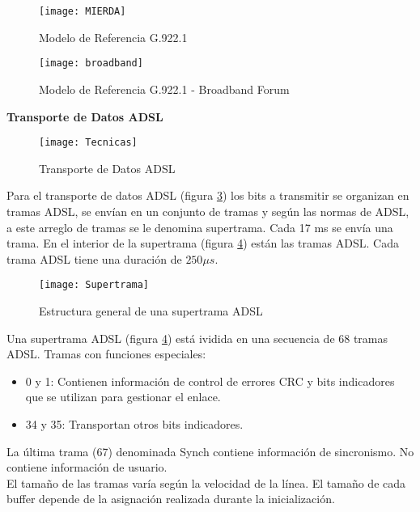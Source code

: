 \documentclass[10pt,portrait, twocolumn]{article}
\begin{document}
\begin{figure}[h]
	\centering
    	\texttt{[image: MIERDA]}
	\caption{Modelo de Referencia G.922.1}
	\label{fig:trADSL}
  \end{figure}	
	
\begin{figure}[h]
	\centering
    	\texttt{[image: broadband]}
	\caption{Modelo de Referencia G.922.1 - Broadband Forum}
	\label{fig:trADSL}
  \end{figure}
	
	
\textbf{Transporte de Datos ADSL}


\begin{figure}[h]
	\centering
    	\texttt{[image: Tecnicas]}
	\caption{Transporte de Datos ADSL}
	\label{fig:trADSL}
  \end{figure}
  
Para el transporte de datos ADSL (figura \ref{fig:trADSL}) los bits a transmitir se organizan en tramas ADSL, se envían en un conjunto de tramas y según las normas de ADSL, a este arreglo de tramas se le denomina supertrama. Cada 17 ms se envía una trama. En el interior de la supertrama (figura \ref{fig:supertrama}) están las tramas ADSL. Cada trama ADSL tiene una duración de $250 \mu s$.
 
 
\begin{figure}[!ht]
	\centering
    	\texttt{[image: Supertrama]}
	\caption{Estructura general de una supertrama ADSL}
	\label{fig:supertrama}
  \end{figure}
  
Una supertrama ADSL (figura \ref{fig:supertrama}) está ividida en una secuencia de 68 tramas ADSL. Tramas con funciones especiales:

	\begin{itemize}
		\item 0 y 1: Contienen información de control de errores CRC y bits indicadores que se utilizan para gestionar el enlace.
		\item 34 y 35: Transportan otros bits indicadores.
	\end{itemize}
	
La última trama (67) denominada Synch contiene información de sincronismo. No contiene información de usuario.\\

El tamaño de las tramas varía según la velocidad de la línea. El tamaño de cada buffer depende de la asignación realizada durante la inicialización.\\
\end{document}

